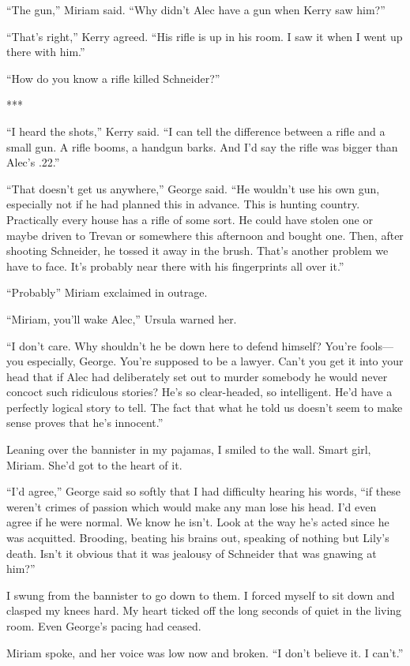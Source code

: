 \documentclass{novel}
\begin{document}
{“The gun,” Miriam said. “Why didn’t Alec have a gun when Kerry saw him?”

“That’s right,” Kerry agreed. “His rifle is up in his room. I saw it when I went up there with him.”

“How do you know a rifle killed Schneider?”

***

“I heard the shots,” Kerry said. “I can tell the difference between a rifle and a small gun. A rifle booms, a handgun barks. And I’d say the rifle was bigger than Alec’s .22.”

“That doesn’t get us anywhere,” George said. “He wouldn’t use his own gun, especially not if he had planned this in advance. This is hunting country. Practically every house has a rifle of some sort. He could have stolen one or maybe driven to Trevan or somewhere this afternoon and bought one. Then, after shooting Schneider, he tossed it away in the brush. That’s another problem we have to face. It’s probably near there with his fingerprints all over it.”

“Probably” Miriam exclaimed in outrage.

“Miriam, you’ll wake Alec,” Ursula warned her.

“I don’t care. Why shouldn’t he be down here to defend himself? You’re fools—you especially, George. You’re supposed to be a lawyer. Can’t you get it into your head that if Alec had deliberately set out to murder somebody he would never concoct such ridiculous stories? He’s so clear-headed, so intelligent. He’d have a perfectly logical story to tell. The fact that what he told us doesn’t seem to make sense proves that he’s innocent.”

Leaning over the bannister in my pajamas, I smiled to the wall. Smart girl, Miriam. She’d got to the heart of it.

“I’d agree,” George said so softly that I had difficulty hearing his words, “if these weren’t crimes of passion which would make any man lose his head. I’d even agree if he were normal. We know he isn’t. Look at the way he’s acted since he was acquitted. Brooding, beating his brains out, speaking of nothing but Lily’s death. Isn’t it obvious that it was jealousy of Schneider that was gnawing at him?”

I swung from the bannister to go down to them. I forced myself to sit down and clasped my knees hard. My heart ticked off the long seconds of quiet in the living room. Even George’s pacing had ceased.

Miriam spoke, and her voice was low now and broken. “I don’t believe it. I can’t.”

}
\end{document}
